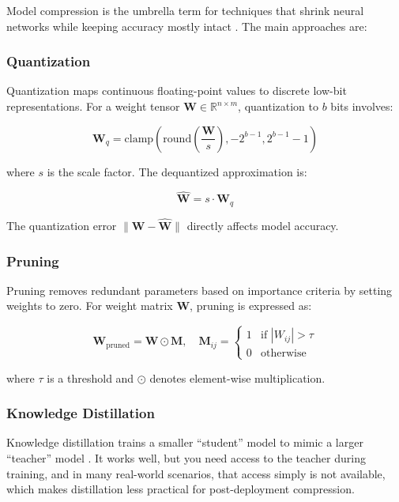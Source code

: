 \documentclass[11pt,a4paper]{article}
\begin{document}
Model compression is the umbrella term for techniques that shrink neural networks while keeping accuracy mostly intact \cite{cheng2017survey}. The main approaches are:

\subsubsection{Quantization}

Quantization maps continuous floating-point values to discrete low-bit representations. For a weight tensor $\mathbf{W} \in \mathbb{R}^{n \times m}$, quantization to $b$ bits involves:

\begin{equation}
\mathbf{W}_q = \text{clamp}\left(\text{round}\left(\frac{\mathbf{W}}{s}\right), -2^{b-1}, 2^{b-1}-1\right)
\end{equation}

where $s$ is the scale factor. The dequantized approximation is:

\begin{equation}
\hat{\mathbf{W}} = s \cdot \mathbf{W}_q
\end{equation}

The quantization error $\|\mathbf{W} - \hat{\mathbf{W}}\|$ directly affects model accuracy.

\subsubsection{Pruning}

Pruning removes redundant parameters based on importance criteria by setting weights to zero. For weight matrix $\mathbf{W}$, pruning is expressed as:

\begin{equation}
\mathbf{W}_{\text{pruned}} = \mathbf{W} \odot \mathbf{M}, \quad \mathbf{M}_{ij} = \begin{cases} 1 & \text{if } |W_{ij}| > \tau \\ 0 & \text{otherwise} \end{cases}
\end{equation}

where $\tau$ is a threshold and $\odot$ denotes element-wise multiplication.

\subsubsection{Knowledge Distillation}

Knowledge distillation trains a smaller ``student'' model to mimic a larger ``teacher'' model \cite{hinton2015distilling}. It works well, but you need access to the teacher during training, and in many real-world scenarios, that access simply is not available, which makes distillation less practical for post-deployment compression.
\end{document}
